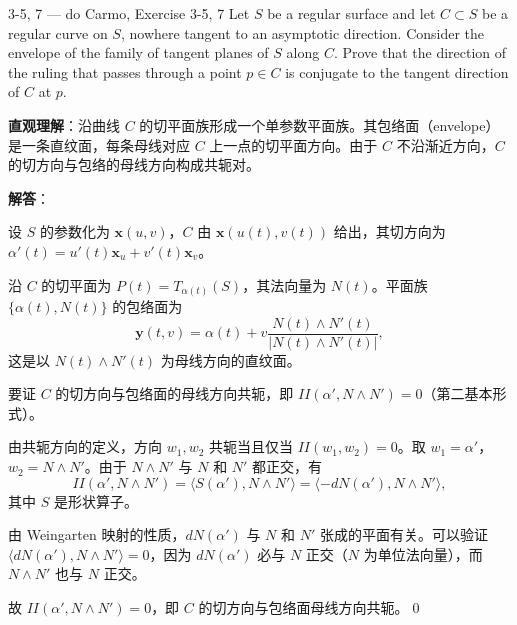 \begin{exercise}{3-5, 7 — do Carmo, Exercise 3-5, 7}
Let $S$ be a regular surface and let $C \subset S$ be a regular curve on $S$, nowhere tangent to an asymptotic direction. Consider the envelope of the family of tangent planes of $S$ along $C$. Prove that the direction of the ruling that passes through a point $p \in C$ is conjugate to the tangent direction of $C$ at $p$.
\end{exercise}
\begin{solution}
\textbf{直观理解}：沿曲线 $C$ 的切平面族形成一个单参数平面族。其包络面（envelope）是一条直纹面，每条母线对应 $C$ 上一点的切平面方向。由于 $C$ 不沿渐近方向，$C$ 的切方向与包络的母线方向构成共轭对。

\textbf{解答}：

设 $S$ 的参数化为 $\mathbf{x}(u,v)$，$C$ 由 $\mathbf{x}(u(t),v(t))$ 给出，其切方向为 $\alpha'(t) = u'(t)\mathbf{x}_u + v'(t)\mathbf{x}_v$。

沿 $C$ 的切平面为 $P(t) = T_{\alpha(t)}(S)$，其法向量为 $N(t)$。平面族 $\{\alpha(t), N(t)\}$ 的包络面为
\[
\mathbf{y}(t,v) = \alpha(t) + v\frac{N(t)\wedge N'(t)}{|N(t)\wedge N'(t)|},
\]
这是以 $N(t)\wedge N'(t)$ 为母线方向的直纹面。

要证 $C$ 的切方向与包络面的母线方向共轭，即 $II(\alpha', N\wedge N') = 0$（第二基本形式）。

由共轭方向的定义，方向 $w_1, w_2$ 共轭当且仅当 $II(w_1, w_2) = 0$。取 $w_1 = \alpha'$，$w_2 = N\wedge N'$。由于 $N\wedge N'$ 与 $N$ 和 $N'$ 都正交，有
\[
II(\alpha', N\wedge N') = \langle S(\alpha'), N\wedge N'\rangle = \langle -dN(\alpha'), N\wedge N'\rangle,
\]
其中 $S$ 是形状算子。

由 Weingarten 映射的性质，$dN(\alpha')$ 与 $N$ 和 $N'$ 张成的平面有关。可以验证 $\langle dN(\alpha'), N\wedge N'\rangle = 0$，因为 $dN(\alpha')$ 必与 $N$ 正交（$N$ 为单位法向量），而 $N\wedge N'$ 也与 $N$ 正交。

故 $II(\alpha', N\wedge N') = 0$，即 $C$ 的切方向与包络面母线方向共轭。\qed
\end{solution}

